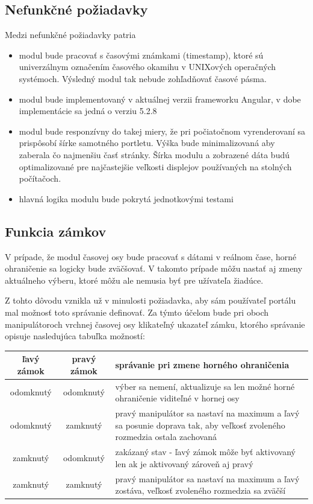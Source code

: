 \documentclass[
  digital, %
  twoside, %
  notable,   %
  nolof,   %
  nolot,   %
]{fithesis3}
\begin{document}
\subsection{Nefunkčné požiadavky}
Medzi nefunkčné požiadavky patria
\begin{itemize}
\item modul bude pracovať s časovými známkami (timestamp), ktoré sú univerzálnym označením časového okamihu v UNIXových operačných systémoch. Výsledný modul tak nebude zohľadňovať časové pásma.
\item modul bude implementovaný v aktuálnej verzii frameworku Angular, v dobe implementácie sa jedná o verziu 5.2.8
\item modul bude responzívny do takej miery, že pri počiatočnom vyrenderovaní sa prispôsobí šírke samotného portletu. Výška bude minimalizovaná aby zaberala čo najmenšiu časť stránky. Šírka modulu a zobrazené dáta budú optimalizované pre najčastejšie veľkosti displejov používaných na stolných počítačoch.
\item hlavná logika modulu bude pokrytá jednotkovými testami
\end{itemize}

\subsection{Funkcia zámkov}
\label{sec:lockers}
V prípade, že modul časovej osy bude pracovať s dátami v reálnom čase, horné ohraničenie sa logicky bude zväčšovať. V takomto prípade môžu nastať aj zmeny aktuálneho výberu, ktoré môžu ale nemusia byť pre užívateľa žiadúce.

Z tohto dôvodu vznikla už v minulosti požiadavka, aby sám používateľ portálu mal možnosť toto správanie definovať. Za týmto účelom bude pri oboch manipulátoroch vrchnej časovej osy klikateľný ukazateľ zámku, ktorého správanie opisuje nasledujúca tabuľka možností:
\begin{center}
  \begin{tabular}{ | c | c || p{6.5cm} | }
    \hline
    ľavý zámok & pravý zámok & správanie pri zmene horného ohraničenia \\ \hline \hline
    odomknutý & odomknutý & výber sa nemení, aktualizuje sa len možné horné ohraničenie viditeľné v hornej osy \\ \hline
    odomknutý & zamknutý & pravý manipulátor sa nastaví na maximum a ľavý sa posunie doprava tak, aby veľkosť zvoleného rozmedzia ostala zachovaná\\ \hline
    zamknutý & odomknutý & zakázaný stav - ľavý zámok môže byť aktivovaný len ak je aktivovaný zároveň aj pravý \\ \hline
    zamknutý & zamknutý & pravý manipulátor sa nastaví na maximum a ľavý zostáva, veľkosť zvoleného rozmedzia sa zväčší \\ \hline
  \end{tabular}
\end{center}
\end{document}
